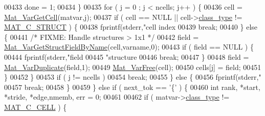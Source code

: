 \begin{DoxyCode}
{{{{{{{00433                     done = 1;
00434                 \}
00435                 \textcolor{keywordflow}{for} ( j = 0 ; j < ncells; j++ ) \{
00436                     cell = \hyperlink{group___m_a_t_gac1e15063439c0bd3eb0c986514c742dc}{Mat\_VarGetCell}(matvar,j);
00437                     \textcolor{keywordflow}{if} ( cell == NULL || cell->\hyperlink{group___m_a_t_aff13035bf3265dd7d9425e5d40c839d4}{class\_type} != 
      \hyperlink{group___m_a_t_ggad4d60ae7b709fc81bfd744fb4c857c40acb467c7749c80902b798134c729bb521}{MAT\_C\_STRUCT} ) \{
00438                         fprintf(stderr,\textcolor{stringliteral}{"cell index %
00439                         \textcolor{keywordflow}{break};
00440                     \} \textcolor{keywordflow}{else} \{
00441                         \textcolor{comment}{/* FIXME: Handle structures > 1x1 */}
00442                         field = \hyperlink{group___m_a_t_ga619d241b49ce97334a38add60562c7be}{Mat\_VarGetStructFieldByName}(cell,varname,0);
00443                         \textcolor{keywordflow}{if} ( field == NULL ) \{
00444                             fprintf(stderr,\textcolor{stringliteral}{"field %
00445                                 \textcolor{stringliteral}{"structure %
00446                             \textcolor{keywordflow}{break};
00447                         \}
00448                         field = \hyperlink{group___m_a_t_ga7ef80c5d99d7918b2b09db3bea106ecc}{Mat\_VarDuplicate}(field,1);
00449                         \hyperlink{group___m_a_t_ga1d14716f7450530fd1c9d02413787f0e}{Mat\_VarFree}(cell);
00450                         cells[j] = field;
00451                     \}
00452                 \}
00453                 \textcolor{keywordflow}{if} ( j != ncells )
00454                     \textcolor{keywordflow}{break};
00455             \} \textcolor{keywordflow}{else} \{
00456                 fprintf(stderr,\textcolor{stringliteral}{"%
00457                 \textcolor{keywordflow}{break};
00458             \}
00459         \} \textcolor{keywordflow}{else} \textcolor{keywordflow}{if} ( next\_tok == \textcolor{charliteral}{'\{'} ) \{
00460             \textcolor{keywordtype}{int} rank, *start, *stride, *edge,nmemb, err = 0;
00461 
00462             \textcolor{keywordflow}{if} ( matvar->\hyperlink{group___m_a_t_aff13035bf3265dd7d9425e5d40c839d4}{class\_type} != \hyperlink{group___m_a_t_ggad4d60ae7b709fc81bfd744fb4c857c40a2f7abb47a1c51e248bd4e5e03cc81b08}{MAT\_C\_CELL} ) \{
}}}}}}}}}}}
\end{DoxyCode}
